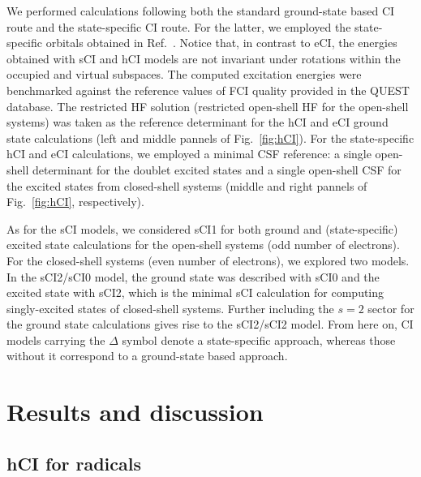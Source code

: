 \documentclass[aip,jcp,reprint,noshowkeys,superscriptaddress]{revtex4-1}
\begin{document}
We performed calculations following both the standard ground-state based CI route and the state-specific CI route. \cite{Kossoski_2023}
For the latter, we employed the state-specific orbitals obtained in Ref.~.
Notice that, in contrast to eCI, the energies obtained with sCI and hCI models are not invariant under rotations within the occupied and virtual subspaces.
The computed excitation energies were benchmarked against the reference values of FCI quality provided in the QUEST database. \cite{Veril_2021}
The restricted HF solution (restricted open-shell HF for the open-shell systems) was taken as the reference determinant for the hCI and eCI ground state calculations
(left and middle pannels of Fig.~\ref{fig:hCI}).
For the state-specific hCI and eCI calculations, we employed a minimal CSF reference: \cite{Kossoski_2023}
a single open-shell determinant for the doublet excited states and a single open-shell CSF for the excited states from closed-shell systems
(middle and right pannels of Fig.~\ref{fig:hCI}, respectively).

As for the sCI models,
we considered sCI1 for both ground and (state-specific) excited state calculations for the open-shell systems (odd number of electrons).
For the closed-shell systems (even number of electrons), we explored two models.
In the sCI2/sCI0 model, the ground state was described with sCI0 and the excited state with sCI2, which is the minimal sCI calculation for computing singly-excited states of closed-shell systems.
Further including the $s=2$ sector for the ground state calculations gives rise to the sCI2/sCI2 model.
From here on, CI models carrying the $\Delta$ symbol denote a state-specific approach, whereas those without it correspond to a ground-state based approach.


\section{Results and discussion}
\label{sec:res}

\subsection{hCI for radicals}
\label{sec:res_A}
\end{document}
